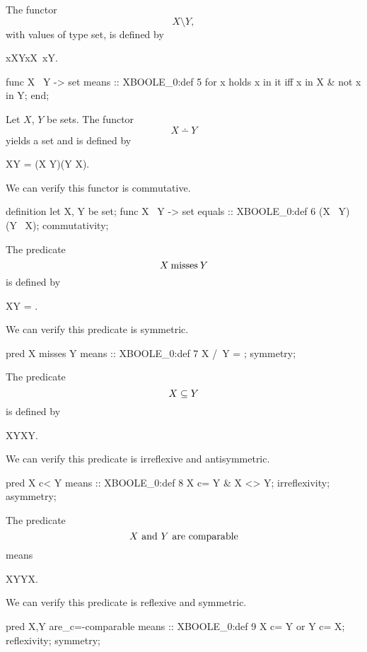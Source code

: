 \begin{paracol}{2}
\switchcolumn*\ensurevspace{5cm}\noindent%
The functor
\[ X\setminus Y,\]
with values of type set, is defined by
\begin{definition}
x\in X\setminus Y\iff x\in X\land\ \neg x\in Y. 
\end{definition}

\switchcolumn

\begin{mizar}
  func X \ Y -> set
  means :: XBOOLE_0:def 5
  for x holds x in it
  iff x in X & not x in Y;
end;
\end{mizar}

\switchcolumn*\ensurevspace{5cm}
Let $X$, $Y$ be sets. The functor
\[ X\dotminus Y\]
yields a set and is defined by
\begin{definition}
X\dotminus Y = (X \setminus Y)\cup(Y \setminus X).
\end{definition}
We can verify this functor is commutative.

\switchcolumn
\begin{mizar}
definition
  let X, Y be set;
  func X \+\ Y -> set
  equals :: XBOOLE_0:def 6
  (X \ Y) \/ (Y \ X);
  commutativity;
\end{mizar}

\switchcolumn*\ensurevspace{5cm}
\noindent The predicate
\[ X\mathbin{\text{misses}} Y\]
is defined by
\begin{definition}
X\cap Y = \emptyset. %
\end{definition}
We can verify this predicate is symmetric.
\switchcolumn
\begin{mizar}
  pred X misses Y
  means :: XBOOLE_0:def 7
  X /\ Y = {};
  symmetry;
\end{mizar}

\switchcolumn*\ensurevspace{5cm}
\noindent The predicate
\[ X \propersubset Y \]
is defined by
\begin{definition}
X\subset Y\land X\neq Y.
\end{definition}
We can verify this predicate is irreflexive and antisymmetric.
\switchcolumn
\begin{mizar}
  pred X c< Y
  means :: XBOOLE_0:def 8
  X c= Y & X <> Y;
  irreflexivity;
  asymmetry;
\end{mizar}

\switchcolumn*\ensurevspace{5cm}
\noindent The predicate
\[X\mbox{ and }Y\mbox{ are comparable}\]
means
\begin{definition}
X\subset Y\lor Y\subset X.
\end{definition}
We can verify this predicate is reflexive and symmetric.
\switchcolumn
\begin{mizar}
  pred X,Y are_c=-comparable
  means :: XBOOLE_0:def 9
  X c= Y or Y c= X;
  reflexivity;
  symmetry;
\end{mizar}


\end{paracol}
